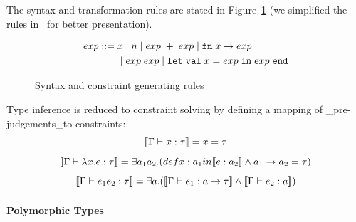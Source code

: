 The syntax and transformation rules are stated in
Figure~\ref{figure:ml-constraints} (we simplified the rules
in~\cite{haack:slicing} for better presentation).

\begin{figure}
\hfil
\begin{minipage}{2.3in}
\begin{align*}
exp ::=\; & x \mid n \mid exp\; + \; exp \mid \mathtt{fn}\; x \rightarrow exp \\
        & \mid exp\; exp \mid \mathtt{let}\; \mathtt{val}\; x = exp\; \mathtt{in}\; exp\; \mathtt{end}
\end{align*}

\end{minipage}
\hfil
\caption{Syntax and constraint generating rules}
\label{figure:ml-constraints}
\end{figure}


Type inference is reduced to constraint solving by defining a mapping
of _pre-judgements_to constraints:
\[\llbracket \Gamma \vdash x:\tau \rrbracket = x =\tau\]
\[\llbracket \Gamma \vdash \lambda x.e:\tau \rrbracket = \exists a_1 a_2.
(def x: a_1 in \llbracket e:a_2 \rrbracket \land a_1 \rightarrow a_2 =\tau)\]
\[\llbracket \Gamma\vdash e_1 e_2 : \tau \rrbracket = \exists a.(\llbracket \Gamma \vdash
e_1:a\rightarrow \tau \rrbracket\land \llbracket \Gamma\vdash e_2:a \rrbracket)\]


\paragraph{Polymorphic Types}

